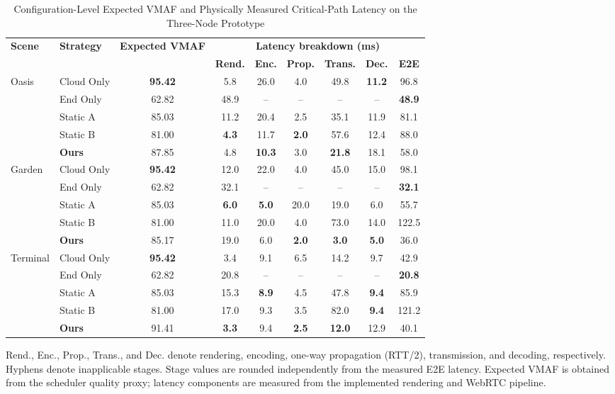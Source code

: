 \documentclass[10pt,journal,compsoc]{IEEEtran}
\begin{document}
\begin{table}[t]
	\centering
	\caption{Configuration-Level Expected VMAF and Physically Measured Critical-Path Latency on the Three-Node Prototype}
	\label{tab:prototype_summary}
	\footnotesize
	\setlength{\tabcolsep}{5pt}
	\renewcommand{\arraystretch}{1.0}
	\begin{tabular*}{\textwidth}{@{\extracolsep{\fill}}llccccccc@{}}
		\toprule
		\multirow{2}{*}{\textbf{Scene}} & \multirow{2}{*}{\textbf{Strategy}} & \multirow{2}{*}{\textbf{Expected VMAF}} &
		\multicolumn{6}{c}{\textbf{Latency breakdown (ms)}} \\
		\cmidrule(lr){4-9}
		& & & \textbf{Rend.} & \textbf{Enc.} & \textbf{Prop.} &
		\textbf{Trans.} & \textbf{Dec.} & \textbf{E2E} \\
		\midrule
		\multirow{5}{*}{Oasis}
		& Cloud Only & \textbf{95.42} & 5.8 & 26.0 & 4.0 & 49.8 & \textbf{11.2} & 96.8 \\
		& End Only & 62.82 & 48.9 & -- & -- & -- & -- & \textbf{48.9} \\
		& Static A & 85.03 & 11.2 & 20.4 & 2.5 & 35.1 & 11.9 & 81.1 \\
		& Static B & 81.00 & \textbf{4.3} & 11.7 & \textbf{2.0} & 57.6 & 12.4 & 88.0 \\
		& \textbf{Ours} & 87.85 & 4.8 & \textbf{10.3} & 3.0 & \textbf{21.8} & 18.1 & 58.0 \\
		\midrule
		\multirow{5}{*}{Garden}
		& Cloud Only & \textbf{95.42} & 12.0 & 22.0 & 4.0 & 45.0 & 15.0 & 98.1 \\
		& End Only & 62.82 & 32.1 & -- & -- & -- & -- & \textbf{32.1} \\
		& Static A & 85.03 & \textbf{6.0} & \textbf{5.0} & 20.0 & 19.0 & 6.0 & 55.7 \\
		& Static B & 81.00 & 11.0 & 20.0 & 4.0 & 73.0 & 14.0 & 122.5 \\
		& \textbf{Ours} & 85.17 & 19.0 & 6.0 & \textbf{2.0} & \textbf{3.0} & \textbf{5.0} & 36.0 \\
		\midrule
		\multirow{5}{*}{Terminal}
		& Cloud Only & \textbf{95.42} & 3.4 & 9.1 & 6.5 & 14.2 & 9.7 & 42.9 \\
		& End Only & 62.82 & 20.8 & -- & -- & -- & -- & \textbf{20.8} \\
		& Static A & 85.03 & 15.3 & \textbf{8.9} & 4.5 & 47.8 & \textbf{9.4} & 85.9 \\
		& Static B & 81.00 & 17.0 & 9.3 & 3.5 & 82.0 & \textbf{9.4} & 121.2 \\
		& \textbf{Ours} & 91.41 & \textbf{3.3} & 9.4 & \textbf{2.5} & \textbf{12.0} & 12.9 & 40.1 \\
		\bottomrule
	\end{tabular*}
	\par\smallskip
	\raggedright\scriptsize Rend., Enc., Prop., Trans., and Dec. denote rendering,
	encoding, one-way propagation (RTT/2), transmission, and decoding, respectively.
	Hyphens denote inapplicable stages. Stage values are rounded independently from the
	measured E2E latency. Expected VMAF is obtained from the scheduler quality proxy; latency components are measured from the implemented rendering and WebRTC pipeline.\par
\end{table}
\end{document}
